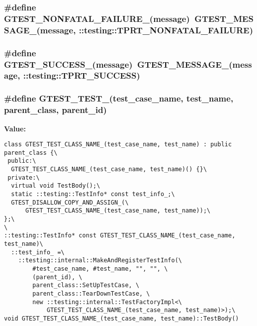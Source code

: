 \subsubsection{\setlength{\rightskip}{0pt plus 5cm}\#define GTEST\_\-NONFATAL\_\-FAILURE\_\-(message)~GTEST\_\-MESSAGE\_\-(message, ::testing::TPRT\_\-NONFATAL\_\-FAILURE)}\label{gtest-internal_8h_3f0f8842dd14a389859c49760088cdee}


\subsubsection{\setlength{\rightskip}{0pt plus 5cm}\#define GTEST\_\-SUCCESS\_\-(message)~GTEST\_\-MESSAGE\_\-(message, ::testing::TPRT\_\-SUCCESS)}\label{gtest-internal_8h_4b58a8f280d5e2872738d4305404cc28}


\subsubsection{\setlength{\rightskip}{0pt plus 5cm}\#define GTEST\_\-TEST\_\-(test\_\-case\_\-name, test\_\-name, parent\_\-class, parent\_\-id)}\label{gtest-internal_8h_0cc6e3639205bae2d72b3eb08d257e34}


\textbf{Value:}

\begin{Code}\begin{verbatim}class GTEST_TEST_CLASS_NAME_(test_case_name, test_name) : public parent_class {\
 public:\
  GTEST_TEST_CLASS_NAME_(test_case_name, test_name)() {}\
 private:\
  virtual void TestBody();\
  static ::testing::TestInfo* const test_info_;\
  GTEST_DISALLOW_COPY_AND_ASSIGN_(\
      GTEST_TEST_CLASS_NAME_(test_case_name, test_name));\
};\
\
::testing::TestInfo* const GTEST_TEST_CLASS_NAME_(test_case_name, test_name)\
  ::test_info_ =\
    ::testing::internal::MakeAndRegisterTestInfo(\
        #test_case_name, #test_name, "", "", \
        (parent_id), \
        parent_class::SetUpTestCase, \
        parent_class::TearDownTestCase, \
        new ::testing::internal::TestFactoryImpl<\
            GTEST_TEST_CLASS_NAME_(test_case_name, test_name)>);\
void GTEST_TEST_CLASS_NAME_(test_case_name, test_name)::TestBody()
\end{verbatim}
\end{Code}
